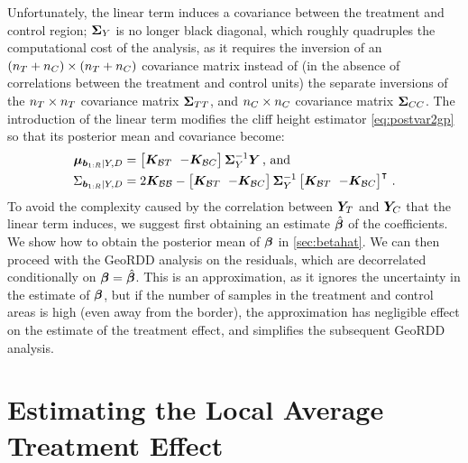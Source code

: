 Unfortunately, the linear term induces a covariance between the treatment and control region; \(\bm{\Sigma}_Y\) is no longer black diagonal, which roughly quadruples the computational cost of the analysis, as it requires the inversion of an \((n_T{}+n_C{}) \times (n_T{}+n_C{})\) covariance matrix instead of (in the absence of correlations between the treatment and control units) the separate inversions of the \(n_T{} \times n_T{}\) covariance matrix \(\bm{\Sigma}_{T T}\), and \(n_C{} \times n_C{}\) covariance matrix \(\bm{\Sigma}_{C C}\).
The introduction of the linear term modifies the cliff height estimator \autoref{eq:postvar2gp} so that its posterior mean and covariance become:
\begin{equation}
    \begin{split}
        \muvec_{\sentinels \mid Y, D} &= 
        \begingroup\SmallColSep
        \begin{bmatrix}
            \KBT & -\KBC
        \end{bmatrix}
        \SigmaMat_Y^{-1}
        \Yvec
        \endgroup
        \,\text{, and}\\
        \Sigma_{\sentinels \mid Y, D} &=
        \begingroup\SmallColSep
        2 \KBB -
        \begin{bmatrix}
            \KBT & -\KBC
        \end{bmatrix}
        \SigmaMat_Y^{-1}
        \begin{bmatrix}
            \KBT & -\KBC
        \end{bmatrix}\trans
        \endgroup
        \,.
    \end{split}
    \label{eq:cliff_with_covariates}
\end{equation}
To avoid the complexity caused by the correlation between \(\bm{Y}_{T}\) and \(\bm{Y}_{C}\) that the linear term induces, we suggest first obtaining an estimate \(\hat{\bm{\beta}}\) of the coefficients.
We show how to obtain the posterior mean of \(\bm{\beta}\) in \autoref{sec:betahat}.
We can then proceed with the GeoRDD analysis on the residuals, which are decorrelated conditionally on \(\bm{\beta}=\hat{\bm{\beta}}\).
This is an approximation, as it ignores the uncertainty in the estimate of \(\bm{\beta}\), but if the number of samples in the treatment and control areas is high (even away from the border), the approximation has negligible effect on the estimate of the treatment effect, and simplifies the subsequent GeoRDD analysis.

\section{Estimating the Local Average Treatment Effect}
\label{sec:ate}

